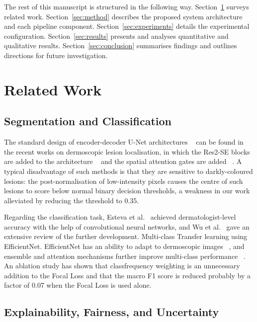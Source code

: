 \documentclass[conference]{IEEEtran}
\begin{document}
The rest of this manuscript is structured in the following way.
Section~\ref{sec:related} surveys related work. Section~\ref{sec:method} describes the proposed system architecture and each pipeline component. Section~\ref{sec:experiments} details the experimental configuration. Section~\ref{sec:results} presents and analyses quantitative and qualitative results. Section~\ref{sec:conclusion} summarises findings and outlines directions for future investigation.

\section{Related Work}
\label{sec:related}

\subsection{Segmentation and Classification}

The standard design of encoder-decoder U-Net architectures ~\cite{seeja2019svm, manzoor2025dualstage} can be found in the recent works on dermoscopic lesion localisation, in which the Res2-SE blocks are added to the architecture ~\cite{liu2025mrpunet} and the spatial attention gates are added ~\cite{pham2023attentionunet}. A typical disadvantage of such methods is that they are sensitive to darkly-coloured lesions: the post-normalisation of low-intensity pixels causes the centre of such lesions to score below normal binary decision thresholds, a weakness in our work alleviated by reducing the threshold to 0.35.

Regarding the classification task, Esteva et al.~\cite{esteva2017dermatologist} achieved dermatologist-level accuracy with the help of convolutional neural networks, and Wu et al.~\cite{wu2022systematic} gave an extensive review of the further development. Multi-class Transfer learning using EfficientNet. EfficientNet has an ability to adapt to dermoscopic images ~\cite{kanchana2024efficientnet}, and ensemble and attention mechanisms further improve multi-class performance ~\cite{alruwaili2025efficientfusion, tahir2023dsccnet}. An ablation study has shown that classfrequency weighting is an unnecessary addition to the Focal Loss\cite{lin2017focal} and that the macro F1 score is reduced probably by a factor of 0.07 when the Focal Loss is used alone.

\subsection{Explainability, Fairness, and Uncertainty}
\end{document}
